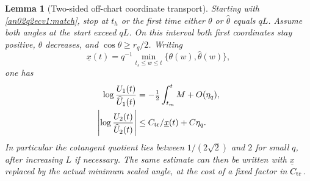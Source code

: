 \documentclass[11pt]{article}
\newtheorem{lemma}[theorem]{Lemma}
\theoremstyle{remark}\newtheorem{remark}[theorem]{Remark}
\begin{document}
\begin{lemma}[Two-sided off-chart coordinate transport]
\label{an02q2ecv1:offtransport}
Starting with \eqref{an02q2ecv1:match}, stop at $t_h$ or the first
time either $\theta$ or $\widehat\theta$ equals $qL$.
Assume both angles at the start exceed $qL$.
On this interval both first coordinates stay positive,
$\theta$ decreases, and $\cos\theta\ge r_q/2$.
Writing
\[
 \underline x(t)=q^{-1}\min_{t_s\le w\le t}
                    \{\theta(w),\widehat\theta(w)\},
\]
one has
\begin{align}
 \log\frac{U_1(t)}{\widehat U_1(t)}
       &=-\tfrac12\int_{t_m}^t M+O(\eta_q),\nonumber\\
 \left|\log\frac{U_2(t)}{\widehat U_2(t)}\right|
       &\le C_{\rm tr}/\underline x(t)+C\eta_q .
 \label{an02q2ecv1:coordinatetransport}
\end{align}
In particular the cotangent quotient lies between
$1/(2\sqrt2)$ and $2$ for small $q$, after increasing $L$ if
necessary. The same estimate can then be written with
$\underline x$ replaced by the actual minimum scaled angle,
at the cost of a fixed factor in $C_{\rm tr}$.
\end{lemma}
\end{document}
